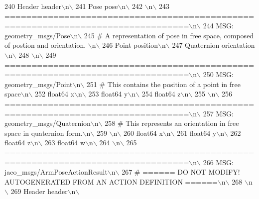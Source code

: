 \begin{DoxyCode}
240 \textcolor{stringliteral}{Header header\(\backslash\)n\(\backslash\)}
241 \textcolor{stringliteral}{Pose pose\(\backslash\)n\(\backslash\)}
242 \textcolor{stringliteral}{\(\backslash\)n\(\backslash\)}
243 \textcolor{stringliteral}{================================================================================\(\backslash\)n\(\backslash\)}
244 \textcolor{stringliteral}{MSG: geometry\_msgs/Pose\(\backslash\)n\(\backslash\)}
245 \textcolor{stringliteral}{# A representation of pose in free space, composed of postion and orientation. \(\backslash\)n\(\backslash\)}
246 \textcolor{stringliteral}{Point position\(\backslash\)n\(\backslash\)}
247 \textcolor{stringliteral}{Quaternion orientation\(\backslash\)n\(\backslash\)}
248 \textcolor{stringliteral}{\(\backslash\)n\(\backslash\)}
249 \textcolor{stringliteral}{================================================================================\(\backslash\)n\(\backslash\)}
250 \textcolor{stringliteral}{MSG: geometry\_msgs/Point\(\backslash\)n\(\backslash\)}
251 \textcolor{stringliteral}{# This contains the position of a point in free space\(\backslash\)n\(\backslash\)}
252 \textcolor{stringliteral}{float64 x\(\backslash\)n\(\backslash\)}
253 \textcolor{stringliteral}{float64 y\(\backslash\)n\(\backslash\)}
254 \textcolor{stringliteral}{float64 z\(\backslash\)n\(\backslash\)}
255 \textcolor{stringliteral}{\(\backslash\)n\(\backslash\)}
256 \textcolor{stringliteral}{================================================================================\(\backslash\)n\(\backslash\)}
257 \textcolor{stringliteral}{MSG: geometry\_msgs/Quaternion\(\backslash\)n\(\backslash\)}
258 \textcolor{stringliteral}{# This represents an orientation in free space in quaternion form.\(\backslash\)n\(\backslash\)}
259 \textcolor{stringliteral}{\(\backslash\)n\(\backslash\)}
260 \textcolor{stringliteral}{float64 x\(\backslash\)n\(\backslash\)}
261 \textcolor{stringliteral}{float64 y\(\backslash\)n\(\backslash\)}
262 \textcolor{stringliteral}{float64 z\(\backslash\)n\(\backslash\)}
263 \textcolor{stringliteral}{float64 w\(\backslash\)n\(\backslash\)}
264 \textcolor{stringliteral}{\(\backslash\)n\(\backslash\)}
265 \textcolor{stringliteral}{================================================================================\(\backslash\)n\(\backslash\)}
266 \textcolor{stringliteral}{MSG: jaco\_msgs/ArmPoseActionResult\(\backslash\)n\(\backslash\)}
267 \textcolor{stringliteral}{# ====== DO NOT MODIFY! AUTOGENERATED FROM AN ACTION DEFINITION ======\(\backslash\)n\(\backslash\)}
268 \textcolor{stringliteral}{\(\backslash\)n\(\backslash\)}
269 \textcolor{stringliteral}{Header header\(\backslash\)n\(\backslash\)}

\end{DoxyCode}
